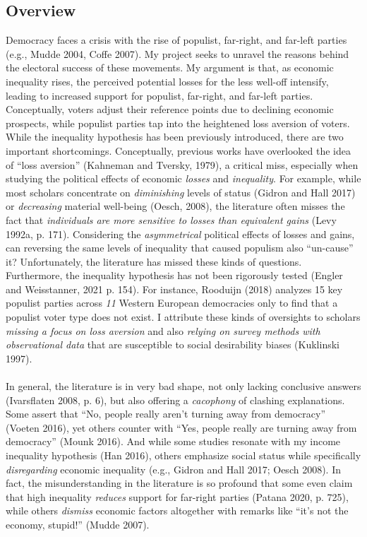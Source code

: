 \documentclass[letterpaper]{article}
\begin{document}
\subsection*{Overview}

Democracy faces a crisis with the rise of populist, far-right, and far-left parties (e.g., Mudde 2004, Coffe 2007). My project seeks to unravel the reasons behind the electoral success of these movements. My argument is that, as economic inequality rises, the perceived potential losses for the less well-off intensify, leading to increased support for populist, far-right, and far-left parties. Conceptually, voters adjust their reference points due to declining economic prospects, while populist parties tap into the heightened loss aversion of voters. While the inequality hypothesis has been previously introduced, there are two important shortcomings. Conceptually, previous works have overlooked the idea of ``loss aversion'' (Kahneman and Tversky, 1979), a critical miss, especially when studying the political effects of economic \emph{losses} and \emph{inequality}. For example, while most scholars concentrate on \emph{diminishing} levels of status (Gidron and Hall 2017) or \emph{decreasing} material well-being (Oesch, 2008), the literature often misses the fact that \emph{individuals are more sensitive to losses than equivalent gains} (Levy 1992a, p. 171). Considering the \emph{asymmetrical} political effects of losses and gains, can reversing the same levels of inequality that caused populism also ``un-cause'' it? Unfortunately, the literature has missed these kinds of questions. Furthermore, the inequality hypothesis has not been rigorously tested (Engler and Weisstanner, 2021 p. 154). For instance, Rooduijn (2018) analyzes 15 key populist parties across \emph{11} Western European democracies only to find that a populist voter type does not exist. I attribute these kinds of oversights to scholars \emph{missing a focus on loss aversion} and also \emph{relying on survey methods with observational data} that are susceptible to social desirability biases (Kuklinski 1997). 

\paragraph{}In general, the literature is in very bad shape, not only lacking conclusive answers (Ivarsflaten 2008, p. 6), but also offering a \emph{cacophony} of clashing explanations. Some assert that ``No, people really aren't turning away from democracy'' (Voeten 2016), yet others counter with ``Yes, people really are turning away from democracy'' (Mounk 2016). And while some studies resonate with my income inequality hypothesis (Han 2016), others emphasize social status while specifically \emph{disregarding} economic inequality (e.g., Gidron and Hall 2017; Oesch 2008). In fact, the misunderstanding in the literature is so profound that some even claim that high inequality \emph{reduces} support for far-right parties (Patana 2020, p. 725), while others \emph{dismiss} economic factors altogether with remarks like ``it's not the economy, stupid!'' (Mudde 2007).  
\end{document}
